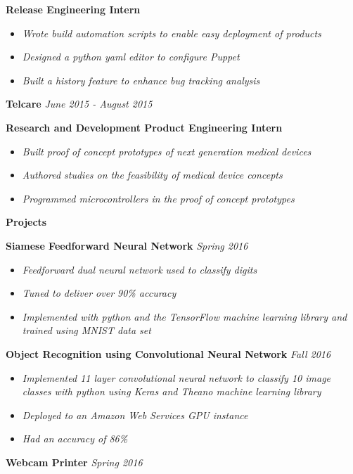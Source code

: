 \documentclass[8pt]{extarticle}
\begin{document}
\textbf{Release Engineering Intern } 
\begin{itemize}
\item \textit{Wrote build automation scripts to enable easy deployment of products}
\item \textit{Designed a python yaml editor to configure Puppet}
\item \textit{Built a history feature to enhance bug tracking analysis}

\end{itemize}
\textbf{Telcare} \textit{June  2015 - August 2015}

\textbf{Research and Development Product Engineering Intern} 
\begin{itemize}
\item \textit{Built proof of concept prototypes of next generation medical devices}
\item \textit{Authored studies on the feasibility of medical device concepts}
\item \textit{Programmed microcontrollers in the proof of concept prototypes}

\end{itemize}
\begin{changemargin}{-0.8cm}{0.0cm}
\textbf{Projects}
\end{changemargin}
\vspace*{-0.4cm}
\makebox[\linewidth]{\rule{17cm}{0.4pt}}
\textbf{Siamese Feedforward Neural Network}  \textit{Spring 2016}

\begin{itemize}
\item \textit{Feedforward dual neural network used to classify digits}
\item \textit{Tuned to deliver over 90\% accuracy}
\item \textit{Implemented with python and the TensorFlow machine learning library and trained using MNIST data set}

\end{itemize}
\textbf{Object Recognition using Convolutional Neural Network}  \textit{Fall 2016}

\begin{itemize}
\item \textit{Implemented 11 layer convolutional neural network to classify 10 image classes with python using Keras and Theano machine learning library}
\item \textit{Deployed to an Amazon Web Services GPU instance}
\item \textit{Had an accuracy of 86\%}

\end{itemize}
\textbf{Webcam Printer}  \textit{Spring 2016}
\end{document}
